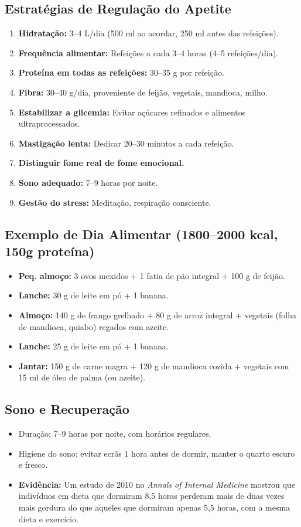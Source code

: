 \documentclass[12pt,a4paper]{scrartcl}
\begin{document}
\subsection{Estratégias de Regulação do Apetite}
\begin{enumerate}
    \item \textbf{Hidratação:} 3–4 L/dia (500 ml ao acordar, 250 ml antes das refeições).
    \item \textbf{Frequência alimentar:} Refeições a cada 3–4 horas (4–5 refeições/dia).
    \item \textbf{Proteína em todas as refeições:} 30–35 g por refeição.
    \item \textbf{Fibra:} 30–40 g/dia, proveniente de feijão, vegetais, mandioca, milho.
    \item \textbf{Estabilizar a glicemia:} Evitar açúcares refinados e alimentos ultraprocessados.
    \item \textbf{Mastigação lenta:} Dedicar 20–30 minutos a cada refeição.
    \item \textbf{Distinguir fome real de fome emocional.}
    \item \textbf{Sono adequado:} 7–9 horas por noite.
    \item \textbf{Gestão do stress:} Meditação, respiração consciente.
\end{enumerate}

\subsection{Exemplo de Dia Alimentar (1800–2000 kcal, 150g proteína)}
\begin{itemize}
    \item \textbf{Peq. almoço:} 3 ovos mexidos + 1 fatia de pão integral + 100 g de feijão.
    \item \textbf{Lanche:} 30 g de leite em pó + 1 banana.
    \item \textbf{Almoço:} 140 g de frango grelhado + 80 g de arroz integral + vegetais (folha de mandioca, quiabo) regados com azeite.
    \item \textbf{Lanche:} 25 g de leite em pó + 1 banana.
    \item \textbf{Jantar:} 150 g de carne magra + 120 g de mandioca cozida + vegetais com 15 ml de óleo de palma (ou azeite).
\end{itemize}

\subsection{Sono e Recuperação}
\begin{itemize}
    \item Duração: 7–9 horas por noite, com horários regulares.
    \item Higiene do sono: evitar ecrãs 1 hora antes de dormir, manter o quarto escuro e fresco.
    \item \textbf{Evidência:} Um estudo de 2010 no \textit{Annals of Internal Medicine} mostrou que indivíduos em dieta que dormiram 8,5 horas perderam mais de duas vezes mais gordura do que aqueles que dormiram apenas 5,5 horas, com a mesma dieta e exercício.
\end{itemize}
\end{document}
